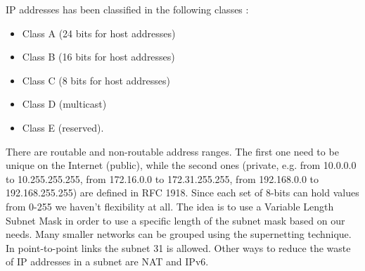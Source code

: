\documentclass[11pt]{article}
\begin{document}
IP addresses has been classified in the following classes :
\begin{itemize}
\item Class A (24 bits for host addresses)
\item Class B (16 bits for host addresses)
\item Class C (8 bits for host addresses)
\item Class D (multicast)
\item Class E (reserved).
\end{itemize}
There are routable and non-routable address ranges. The first one need to be unique on the Internet (public), while the second ones (private, e.g. from 10.0.0.0 to 10.255.255.255, from 172.16.0.0 to 172.31.255.255, from 192.168.0.0
to 192.168.255.255) are defined in RFC 1918. Since each set of 8-bits can hold values from 0-255 we haven't flexibility at all. The idea is to use a Variable Length Subnet Mask in order to use a specific length of the subnet mask based on our needs. Many smaller networks can be grouped using the supernetting technique. In point-to-point links the subnet 31 is allowed. Other ways to reduce the waste of IP addresses in a subnet are NAT and IPv6.
\end{document}
